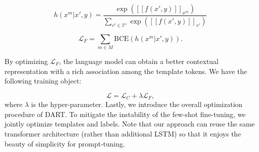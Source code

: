 \documentclass{article} \usepackage{iclr2022_conference,times}
\begin{document}
\begin{equation}
\label{eq:mlm_eq}
    h(x^m|x', y) = \frac{\exp([\![f(x', y)]\!]_{x^m})}{\sum\limits_{v' \in \mathcal{V'}} \exp([\![f(x', y)]\!]_{v'})} 
\end{equation}

\begin{equation}
    \mathcal{L}_{F}=\sum_{m \in M}\mathrm{BCE}(h(x^m|x', y)).
\end{equation}

By optimizing $\mathcal{L}_{F}$, the language model can obtain a better contextual representation with a rich association among the template tokens. 
We have the following training object:

\begin{equation}
    \mathcal{L}=\mathcal{L}_{C}+
    \lambda \mathcal{L}_{F},
\end{equation}
where $\lambda$ is the hyper-parameter. 
Lastly, we introduce the overall optimization procedure of DART. 
To mitigate the instability of the few-shot fine-tuning, we jointly optimize templates and labels. 
Note that our approach can reuse the same transformer architecture (rather than additional LSTM) so that it enjoys the beauty of simplicity for prompt-tuning.



\iffalse
\begin{algorithm}[h]
  \caption{Differentiable Prompt Fine-tuning Algorithm with Two-stage Optimization} \label{alg}
  \begin{algorithmic}[1]
    \Require
        $\mathcal{J}(\theta)$: stochastic objective function with parameters $\theta$;
        $\alpha$,$\beta$: learning rate;
        $h \in \theta$: parameters of the templates and label tokens;  
    
    \State initialize $t \gets 0$;
    \While{$h_t$ not converged} \Comment{Template and label optimization with learning rate $\alpha$}
        \label{alg:iteration1}
        \State  $t \gets t + 1$; 
        \State  $g_t \gets \nabla_{\theta} f_t(\theta_{t-1})$;
        \State  $h_t \gets AdamW(g_t,\alpha)$;
    \EndWhile

    \label{alg:iteration11}
    \While{$\theta_t$ not converged} \Comment{All parameter optimization with learning rate $\beta$}
        \label{alg:iteration2} 
        \State $t \gets t + 1$ ;
        \State $g_t \gets \nabla_{\theta} f_t(\theta_{t-1})$;
        \State $\theta_t \gets AdamW(g_t,\beta)$;
    \EndWhile
    \label{alg:iteration22}

  \end{algorithmic}
\end{algorithm}
\fi
\end{document}
